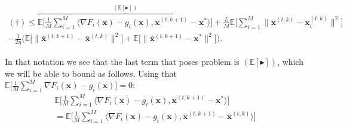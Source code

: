 \begin{align*}
    (\dagger) \leq \overbrace{\mathbb{E} \Bigg[ \frac{1}{M} \sum_{i=1}^M  \langle \nabla F_i(\bm{x}) - g_i(\bm{x})  ,\bar{\bm{x}}^{(t,k+1)} - \bm{x}^{*} \rangle    \Bigg] }^{(\mathbb{E}[\blacktriangleright])}
    + \frac{L}{M}  \mathbb{E} \Bigg[ \sum_{i=1}^M \|\bar{\bm{x}}^{(t,k)}-\bm{x}_i^{(t,k)} \|^2 \Bigg] \\ -  \frac{1}{2\eta} \Bigg( \mathbb{E} \Big[  \|  \bar{\bm{x}}^{(t,k+1)} - \bar{\bm{x}}^{(t,k)} \|^2 \Big] 
    + \mathbb{E} \Big[  \| \bar{\bm{x}}^{(t,k+1)} - \bm{x}^{*} \|^2  \Big] \Bigg).
\end{align*}

In that notation we see that the last term that poses problem is $(\mathbb{E}[\blacktriangleright])$, which we will be able to bound as follows. Using that $\mathbb{E} \big[ \frac{1}{M} \sum_{i=1}^M \nabla F_i(\bm{x}) - g_i(\bm{x}) \big] = 0$:
\begin{align*}
    \mathbb{E} \Bigg[ \frac{1}{M} \sum_{i=1}^M  \langle \nabla F_i(\bm{x}) - g_i(\bm{x})  ,\bar{\bm{x}}^{(t,k+1)} - \bm{x}^{*} \rangle \Bigg] \\
    = \mathbb{E} \Bigg[ \frac{1}{M} \sum_{i=1}^M  \langle \nabla F_i(\bm{x}) - g_i(\bm{x})  ,\bar{\bm{x}}^{(t,k+1)} - \bar{\bm{x}}^{(t,k)} \rangle \Bigg] \\
\end{align*}